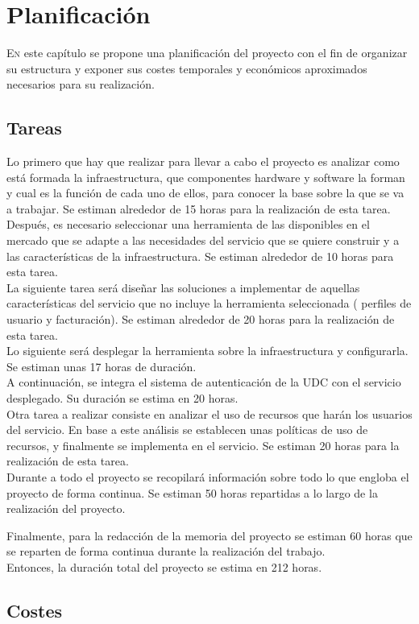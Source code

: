 \chapter{Planificación}
\label{chap:planificacionProyecto}
\lettrine{E}{n} este capítulo se propone una planificación del proyecto con el fin de organizar su estructura y exponer sus costes temporales y económicos aproximados necesarios para su realización.

\section{Tareas}
Lo primero que hay que realizar para llevar a cabo el proyecto es analizar como está formada la infraestructura, que componentes hardware y software la forman y cual es la función de cada uno de ellos, para conocer la base sobre la que se va a trabajar. Se estiman alrededor de 15 horas para la realización de esta tarea.\\

Después, es necesario seleccionar una herramienta de las disponibles en el mercado que se adapte a las necesidades del servicio que se quiere construir y a las características de la infraestructura. Se estiman alrededor de 10 horas para esta tarea.\\

La siguiente tarea será diseñar las soluciones a implementar de aquellas características del servicio que no incluye la herramienta seleccionada ( perfiles de usuario y facturación). Se estiman alrededor de 20 horas para la realización de esta tarea.\\
Lo siguiente será desplegar la herramienta sobre la infraestructura y configurarla. Se estiman unas 17 horas de duración.\\

A continuación, se integra el sistema de autenticación de la UDC con el servicio desplegado. Su duración se estima en 20 horas.\\

Otra tarea a realizar consiste en analizar el uso de recursos que harán los usuarios del servicio. En base a este análisis se establecen unas políticas de uso de recursos, y finalmente se implementa en el servicio. Se estiman 20 horas para la realización de esta tarea.\\

Durante a todo el proyecto  se recopilará información sobre todo lo que engloba el proyecto de forma continua. Se estiman 50 horas repartidas a lo largo de la realización del proyecto.

Finalmente, para la redacción de la memoria del proyecto se estiman 60 horas que se reparten de forma continua durante la realización del trabajo.\\
Entonces, la duración total del proyecto se estima en 212 horas.

\section{Costes}